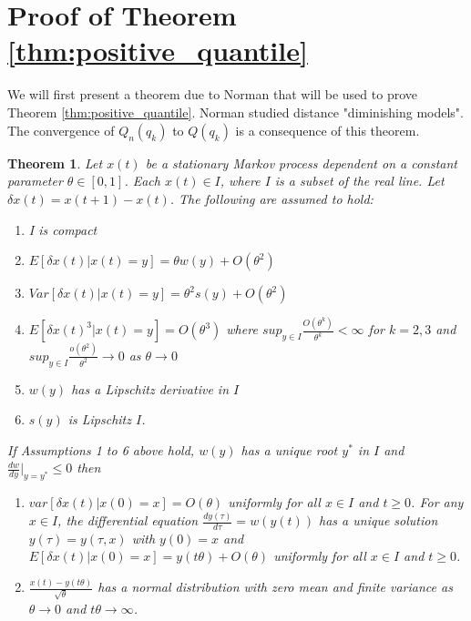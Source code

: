 \documentclass[10pt, a4paper]{article}
\newtheorem{theorem}{Theorem}
\newtheorem{rational for conjecture}{Rational for Conjecture}
\begin{document}



\clearpage

\appendix
\section{Proof of Theorem \ref{thm:positive_quantile}}
\label{app:proof}

We will first present a theorem due to Norman \cite{Norman1972} that will be used to prove Theorem \ref{thm:positive_quantile}.
Norman \cite{Norman1972} studied distance "diminishing models". The convergence of $\widehat{Q_n}(q_k)$ to $Q(q_k)$ is a consequence of this theorem.
\begin{theorem}
\label{thm:Norman}
Let $x(t)$  be a stationary Markov process dependent on a constant parameter $\theta \in [0,1]$. Each $x(t) \in I$, where $I$ is  a  subset  of  the  real  line.  Let $\delta x(t)=x(t+1)-x(t)$. The following are assumed to hold:
\begin{enumerate}
\item I is compact
\item $E [\delta x(t) | x(t)=y]= \theta w(y)+ O(\theta^2)$
\item $Var [\delta x(t) | x(t)=y]= \theta ^2 s(y)+ O(\theta^2)$
\item $E [\delta x(t)^3 | x(t)=y]=  O(\theta ^3)$
where $sup_{y \in I} \frac{O(\theta^k)}{\theta^k}< \infty$ for $k=2,3$ and $sup_{y \in I} \frac{o(\theta^2)}{\theta^2} \rightarrow 0$ as $\theta \rightarrow 0$
\item $w(y)$ has a Lipschitz derivative in $I$
\item $s(y)$ is Lipschitz $I$.
\end{enumerate}
If Assumptions 1 to 6 above hold, $w(y)$ has a unique root $y^*$ in $I$ and
$\frac{d w}{d y}  \bigg|_{y=y^*} \le 0$ then
\begin{enumerate}
\item $var [\delta x(t) | x(0)=x]=O(\theta)$ uniformly for all $x \in I$ and $t \ge 0$.
For any $x \in I$,  the differential equation $\frac{d y(\tau)}{d \tau}=w(y(t))$ has a unique solution  $y(\tau)=y(\tau,x)$ with $y(0)=x$  and	$E [\delta x(t) | x(0)=x]=y( t \theta)+O(\theta)$ uniformly for all $x \in I$ and  $t \ge 0$.
\item $\frac{x(t)-y(t \theta)}{\sqrt \theta}$ has a normal distribution with zero mean and finite variance as $\theta \rightarrow 0$ and $t \theta \rightarrow \infty$.
\end{enumerate}
\end{theorem}
\end{document}

